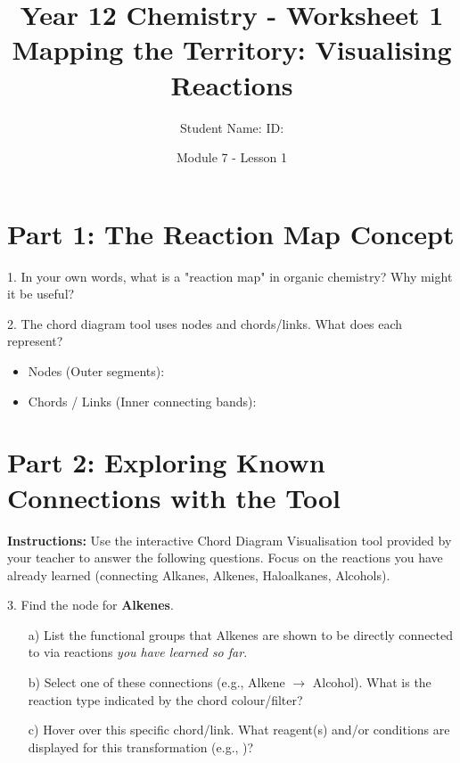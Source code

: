 \documentclass[11pt, a4paper]{article}
\title{Year 12 Chemistry - Worksheet 1 \\ Mapping the Territory: Visualising Reactions}
\date{Module 7 - Lesson 1}
\author{Student Name: \underline{\hspace{5cm}} ID: \underline{\hspace{3cm}}} %
\begin{document}
\maketitle

\section*{Part 1: The Reaction Map Concept}

1.  In your own words, what is a "reaction map" in organic chemistry? Why might it be useful?
    \vspace{2cm}

2.  The chord diagram tool uses nodes and chords/links. What does each represent?
    \begin{itemize}
        \item Nodes (Outer segments): \underline{\hspace{6cm}}
        \item Chords / Links (Inner connecting bands): \underline{\hspace{6cm}}
    \end{itemize}

\section*{Part 2: Exploring Known Connections with the Tool}

\textbf{Instructions:} Use the interactive Chord Diagram Visualisation tool provided by your teacher to answer the following questions. Focus on the reactions you have already learned (connecting Alkanes, Alkenes, Haloalkanes, Alcohols).

3.  Find the node for \textbf{Alkenes}.
    \begin{itemize}
        \item[a)] List the functional groups that Alkenes are shown to be directly connected to via reactions \textit{you have learned so far}.
        \vspace{1cm}
        \item[b)] Select one of these connections (e.g., Alkene $\rightarrow$ Alcohol). What is the reaction type indicated by the chord colour/filter?
        \vspace{0.5cm}
        \item[c)] Hover over this specific chord/link. What reagent(s) and/or conditions are displayed for this transformation (e.g., )?
        \vspace{1cm}
    \end{itemize}
\end{document}
